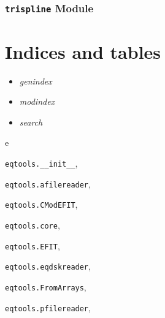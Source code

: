 \documentclass[letterpaper,10pt,english]{sphinxmanual}
\begin{document}
\subsection{\texttt{trispline} Module}
\label{eqtools:trispline-module}

\chapter{Indices and tables}
\label{index:indices-and-tables}\begin{itemize}
\item {} 
\emph{genindex}

\item {} 
\emph{modindex}

\item {} 
\emph{search}

\end{itemize}


\renewcommand{\indexname}{Python Module Index}
\begin{theindex}
\def\bigletter#1{{\Large\sffamily#1}\nopagebreak\vspace{1mm}}
\bigletter{e}
\item {\texttt{eqtools.\_\_init\_\_}}, \pageref{eqtools:module-eqtools.__init__}
\item {\texttt{eqtools.afilereader}}, \pageref{eqtools:module-eqtools.afilereader}
\item {\texttt{eqtools.CModEFIT}}, \pageref{eqtools:module-eqtools.CModEFIT}
\item {\texttt{eqtools.core}}, \pageref{eqtools:module-eqtools.core}
\item {\texttt{eqtools.EFIT}}, \pageref{eqtools:module-eqtools.EFIT}
\item {\texttt{eqtools.eqdskreader}}, \pageref{eqtools:module-eqtools.eqdskreader}
\item {\texttt{eqtools.FromArrays}}, \pageref{eqtools:module-eqtools.FromArrays}
\item {\texttt{eqtools.pfilereader}}, \pageref{eqtools:module-eqtools.pfilereader}
\end{theindex}

\renewcommand{\indexname}{Index}
\printindex
\end{document}
